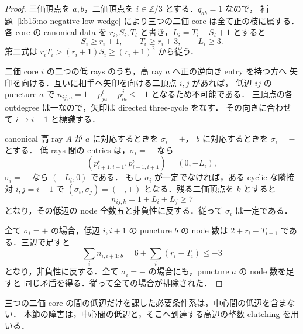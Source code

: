 \begin{proof}
三価頂点を $a,b$，二価頂点を $i\in\mathbb Z/3$ とする．$q_{ab}=1$ なので，
補題~\ref{kb15:no-negative-low-wedge} により三つの二価 core は全て正の枝に属する．
各 core の canonical data を $r_i,S_i,T_i$ と書き，$L_i=T_i-S_i+1$ とすると
\begin{equation}\label{kb15:positive-bounds}
 S_i\geq r_i+1,\qquad T_i\geq r_i+3,\qquad L_i\geq3.
\end{equation}
第二式は $r_iT_i>(r_i+1)S_i\geq(r_i+1)^2$ から従う．

二価 core $i$ の二つの低 rays のうち，高 ray $a$ へ正の逆向き entry を持つ方へ
矢印を向ける．互いに相手へ矢印を向ける二頂点 $i,j$ があれば，
低辺 $ij$ の puncture $a$ で
$n_{ij;a}=1-p^i_{ja}-p^j_{ia}\leq-1$ となるため不可能である．
三頂点の各 outdegree は一なので，矢印は directed three-cycle をなす．
その向きに合わせて $i\to i+1$ と標識する．

canonical 高 ray $A$ が $a$ に対応するときを $\sigma_i=+$，
$b$ に対応するときを $\sigma_i=-$ とする．
低 rays 間の entries は，$\sigma_i=+$ なら
\[
 (p^i_{i+1,i-1},p^i_{i-1,i+1})=(0,-L_i),
\]
$\sigma_i=-$ なら $(-L_i,0)$ である．
もし $\sigma_i$ が一定でなければ，ある cyclic な隣接対 $i,j=i+1$ で
$(\sigma_i,\sigma_j)=(-,+)$ となる．残る二価頂点を $k$ とすると
\[
 n_{ij;k}=1+L_i+L_j\geq7
\]
となり，その低辺の node 全数五と非負性に反する．従って $\sigma_i$ は一定である．

全て $\sigma_i=+$ の場合，低辺 $i,i+1$ の puncture $b$ の node 数は
$2+r_i-T_{i+1}$ である．三辺で足すと
\[
 \sum_i n_{i,i+1;b}=6+\sum_i(r_i-T_i)\leq-3
\]
となり，非負性に反する．全て $\sigma_i=-$ の場合にも，puncture $a$ の node 数を足すと
同じ矛盾を得る．従って全ての場合が排除された．
\end{proof}

三つの二価 core の間の低辺だけを課した必要条件系は，中心間の低辺を含まない．
本節の障害は，中心間の低辺と，そこへ到達する高辺の整数 clutching を用いる．
